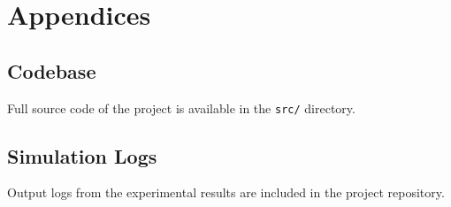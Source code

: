 \documentclass[12pt]{article}
\begin{document}
\section{Appendices}
\subsection{Codebase}
Full source code of the project is available in the \texttt{src/} directory.

\subsection{Simulation Logs}
Output logs from the experimental results are included in the project repository.
\end{document}
